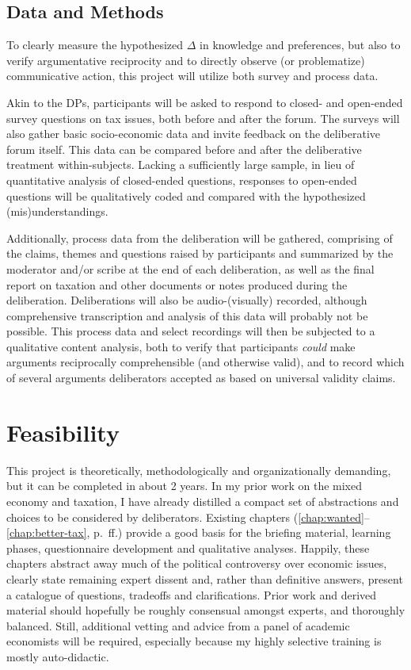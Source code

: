 \subsection{Data and Methods}
To clearly measure the hypothesized $\Delta$ in knowledge and preferences, but also to verify argumentative reciprocity and to directly observe (or problematize) communicative action, this project will utilize both survey and process data.

Akin to the \gls{DP}s, participants will be asked to respond to closed- and open-ended survey questions on tax issues, both before and after the forum.
The surveys will also gather basic socio-economic data and invite feedback on the deliberative forum itself.
This data can be compared before and after the deliberative treatment within-subjects.
Lacking a sufficiently large sample, in lieu of quantitative analysis of closed-ended questions, responses to open-ended questions will be qualitatively coded and compared with the hypothesized (mis)understandings.

Additionally, process data from the deliberation will be gathered, comprising of the claims, themes and questions raised by participants and summarized by the moderator and/or scribe at the end of each deliberation, as well as the final report on taxation and other documents or notes produced during the deliberation.
Deliberations will also be audio-(visually) recorded, although comprehensive transcription and analysis of this data will probably not be possible.
This process data and select recordings will then be subjected to a qualitative content analysis, both to verify that participants \emph{could} make arguments reciprocally comprehensible (and otherwise valid), and to record which of several arguments deliberators accepted as based on universal validity claims.

\section{Feasibility}
This project is theoretically, methodologically and organizationally demanding, but it can be completed in about 2 years.
In my prior work on the mixed economy and taxation, I have already distilled a compact set of abstractions and choices to be considered by deliberators.
Existing chapters (\ref{chap:wanted}--\ref{chap:better-tax}, p.~\pageref{chap:wanted}ff.) provide a good basis for the briefing material, learning phases, questionnaire development and qualitative analyses.
Happily, these chapters abstract away much of the political controversy over economic issues, clearly state remaining expert dissent and, rather than definitive answers, present a catalogue of questions, tradeoffs and clarifications.
Prior work and derived material should hopefully be roughly consensual amongst experts, and thoroughly balanced.
Still, additional vetting and advice from a panel of academic economists will be required, especially because my highly selective training is mostly auto-didactic.


